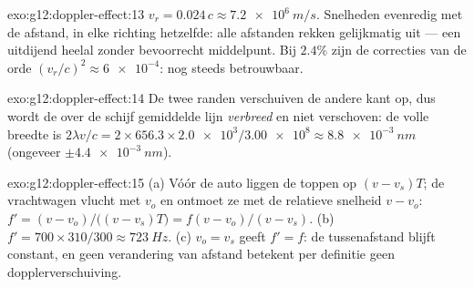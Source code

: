 \begin{solution}{exo:g12:doppler-effect:13}
$v_r = 0.024\,c \approx \qty{7.2e6}{m/s}$. Snelheden evenredig met de
afstand, in elke richting hetzelfde: alle afstanden rekken gelijkmatig uit
--- een uitdijend heelal zonder bevoorrecht middelpunt. Bij $2.4\%$ zijn
de correcties van de orde $(v_r/c)^2 \approx \num{6e-4}$: nog steeds
betrouwbaar.
\end{solution}

\begin{solution}{exo:g12:doppler-effect:14}
De twee randen verschuiven de andere kant op, dus wordt de over de schijf
gemiddelde lijn \emph{verbreed} en niet verschoven: de volle breedte is
$2\lambda v/c = 2 \times 656.3 \times \num{2.0e3}/\num{3.00e8} \approx
\qty{8.8e-3}{nm}$ (ongeveer $\pm\qty{4.4e-3}{nm}$).
\end{solution}

\begin{solution}{exo:g12:doppler-effect:15}
(a) Vóór de auto liggen de toppen op $(v - v_s)T$; de vrachtwagen vlucht
met $v_o$ en ontmoet ze met de relatieve snelheid $v - v_o$:
$f' = (v - v_o)/\bigl((v - v_s)T\bigr) = f(v - v_o)/(v - v_s)$.
(b) $f' = 700 \times 310/300 \approx \qty{723}{Hz}$. (c) $v_o = v_s$
geeft $f' = f$: de tussenafstand blijft constant, en geen verandering van
afstand betekent per definitie geen dopplerverschuiving.
\end{solution}

